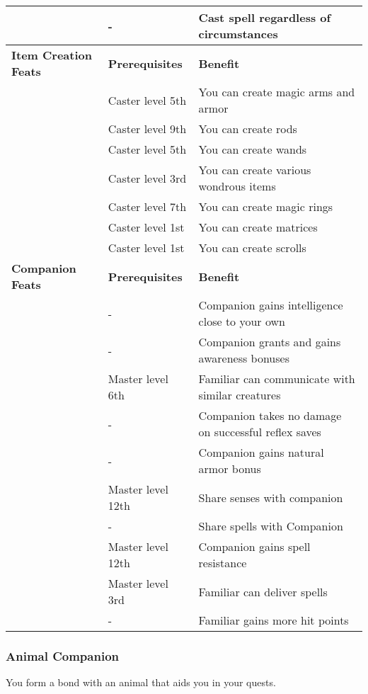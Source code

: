 \begin{table*}
{\begin{tabular}{|p{}|p{}|p{}|}
\nameref{Feat:UnconditionalSpell}&-&Cast spell regardless of circumstances\\
\hline
\textbf{Item Creation Feats}&\textbf{Prerequisites}&\textbf{Benefit}\\
\hline
\nameref{Feat:CraftMagicArmsAndArmor}&Caster level 5th&You can create magic arms and armor\\
\nameref{Feat:CraftRod}&Caster level 9th&You can create rods\\
\nameref{Feat:CraftWand}&Caster level 5th&You can create wands\\
\nameref{Feat:CraftWondrousItem}&Caster level 3rd&You can create various wondrous items\\
\nameref{Feat:ForgeRing}&Caster level 7th&You can create magic rings\\
\nameref{Feat:ImbueMatrix}&Caster level 1st&You can create matrices\\
\nameref{Feat:ScribeScroll}&Caster level 1st&You can create scrolls\\
\hline
\textbf{Companion Feats}&\textbf{Prerequisites}&\textbf{Benefit}\\
\hline
\nameref{Feat:CerebralCompanion}&-&Companion gains intelligence close to your own\\
\nameref{Feat:CompanionAlertness}&-&Companion grants and gains awareness bonuses\\
\nameref{Feat:CompanionCommunication}&Master level 6th&Familiar can communicate with similar creatures\\
\nameref{Feat:CompanionEvasion}&-&Companion takes no damage on successful reflex saves\\
\nameref{Feat:CompanionHardiness}&-&Companion gains natural armor bonus\\
\nameref{Feat:CompanionSightLink}&Master level 12th&Share senses with companion\\
\nameref{Feat:CompanionSpellLink}&-&Share spells with Companion\\
\nameref{Feat:CompanionSpellResistance}&Master level 12th&Companion gains spell resistance\\
\nameref{Feat:FamiliarSpellDelivery}&Master level 3rd&Familiar can deliver spells\\
\nameref{Feat:FamiliarToughness}&-&Familiar gains more hit points\\
\hline
\end{tabular}}
\end{table*}

\subsubsection{Animal Companion}
\label{Feat:AnimalCompanion}
You form a bond with an animal that aids you in your quests.

